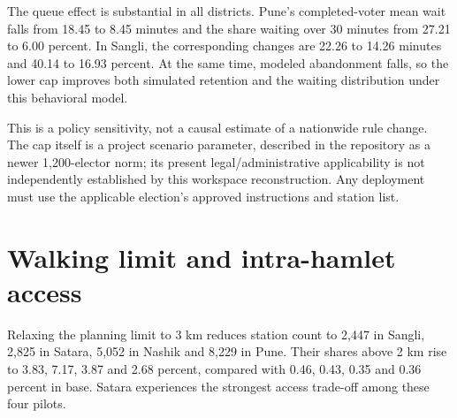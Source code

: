 \documentclass[11pt,a4paper,oneside]{report}
\newcommand{\source}[1]{\par\nopagebreak[4]{\footnotesize\color{teal}Evidence: #1.}\par}
\begin{document}
The queue effect is substantial in all districts. Pune's completed-voter mean wait falls from 18.45 to 8.45 minutes and the share waiting over 30 minutes from 27.21 to 6.00 percent. In Sangli, the corresponding changes are 22.26 to 14.26 minutes and 40.14 to 16.93 percent. At the same time, modeled abandonment falls, so the lower cap improves both simulated retention and the waiting distribution under this behavioral model.

This is a policy sensitivity, not a causal estimate of a nationwide rule change. The cap itself is a project scenario parameter, described in the repository as a newer 1,200-elector norm; its present legal/administrative applicability is not independently established by this workspace reconstruction. Any deployment must use the applicable election's approved instructions and station list.
\source{[S8], [S9], [S11]}

\section{Walking limit and intra-hamlet access}
Relaxing the planning limit to 3 km reduces station count to 2,447 in Sangli, 2,825 in Satara, 5,052 in Nashik and 8,229 in Pune. Their shares above 2 km rise to 3.83, 7.17, 3.87 and 2.68 percent, compared with 0.46, 0.43, 0.35 and 0.36 percent in base. Satara experiences the strongest access trade-off among these four pilots.
\end{document}
